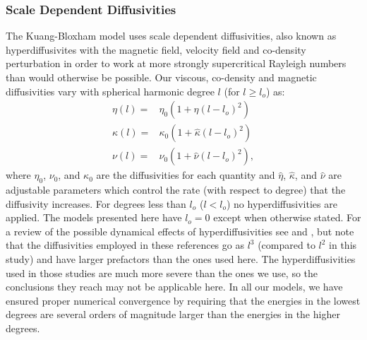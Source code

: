 \subsubsection{Scale Dependent Diffusivities}
\label{sec:hyperdiffusivity}
The Kuang-Bloxham model uses scale dependent diffusivities, also known as hyperdiffusivites with the magnetic field, velocity field and co-density perturbation in order to work at more strongly supercritical Rayleigh numbers than would otherwise be possible. Our viscous, co-density and magnetic diffusivities vary with spherical harmonic degree $l$ (for $l\geq l_{o}$) as:
\begin{align}
\eta\left(l\right)= & {} \eta_{0}\left(1+\hat{\eta} \left(l-l_{o}\right)^{2}\right) \label{eq:hyperdiffseta}\\
\kappa\left(l\right)= & {} \kappa_{0}\left(1+\hat{\kappa} \left(l-l_{o}\right)^{2}\right) \label{eq:hyperdiffskappa}\\
\nu\left(l\right)= & {} \nu_{0}\left(1+\hat{\nu} \left(l-l_{o}\right)^{2}\right), \label{eq:hyperdiffsnu} 
\end{align}
where $\eta_{0}$, $\nu_{0}$, and $\kappa_{0}$ are the diffusivities for each quantity and $\hat{\eta}$, $\hat{\kappa}$, and $\hat{\nu}$ are adjustable parameters which control the rate (with respect to degree) that the diffusivity increases. For degrees less than $l_{o}$ ($l<l_{o}$) no hyperdiffusivities are applied. The models presented here have $l_{o}=0$ except when otherwise stated. For a review of the possible dynamical effects of hyperdiffusivities see \citet{zhang1998} and \cite{grote2000}, but note that the diffusivities employed in these references go as $l^3$ (compared to $l^2$ in this study) and have larger prefactors than the ones used here. The hyperdiffusivities used in those studies are much more severe than the ones we use, so the conclusions they reach may not be applicable here. In all our models, we have ensured proper numerical convergence by requiring that the energies in the lowest degrees are several orders of magnitude larger than the energies in the higher degrees.

